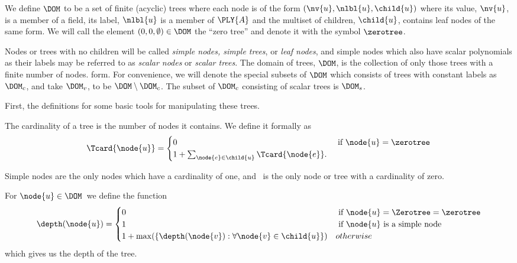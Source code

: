 \begin{definition}\label{def-of-dom}
We define $\DOM$ to be a set of finite (acyclic) trees where each node is of the form
$(\nv{u},\nlbl{u},\child{u})$
where its value, $\nv{u}$, is a member
of a field, its label, \(\nlbl{u}\) is a member of $\PLY{A}$ and
the multiset of children, $\child{u}$, contains leaf nodes of the same
form. We will call the element $(0, 0, \emptyset) \in \DOM$ the
``zero tree'' and denote it with the symbol $\zerotree$.

Nodes or trees with no children will be called \emph{simple nodes,
  simple trees}, or \emph{leaf nodes}, and simple nodes which also
have scalar polynomials as their labels may be referred to as
\emph{scalar nodes} or \emph{scalar trees}. The domain of trees,
$\DOM$, is the collection of only those trees with a finite number of
nodes.  form. For convenience, we will denote the special subsets of
$\DOM$ which consists of trees with constant labels as $\DOM_c$, and
take $\DOM_v$, to be $\DOM \setminus \DOM_c$.  The subset of $\DOM_c$
consisting of scalar trees is $\DOM_s$.
\end{definition}

First, the definitions for some basic tools for manipulating these trees.
\begin{definition}
  The cardinality of a tree is the number of nodes it contains. We define it formally as
  \begin{align*}
    \Tcard{\node{u}} = \begin{cases}
      0 & \text{ if } \node{u} = \zerotree\\
      1 + \sum_{\node{e}\in\child{u}} \Tcard{\node{e}}.
    \end{cases}
  \end{align*}

  Simple nodes are the only nodes which have a cardinality of one, and \tzerotree\ is the only node or tree with a
  cardinality of zero.
\end{definition}

\begin{definition}
  For $\node{u} \in \DOM$\ we define the function
  \begin{align*}
    \depth(\node{u}) = \begin{cases}
      0 & \text{ if } \node{u} = \Zerotree = \zerotree \\
      1 & \text{ if } \node{u} \text{ is a simple node} \\
      1 + \max(\lbrace\depth(\node{v}):\forall \node{v} \in \child{u}\rbrace) & otherwise
    \end{cases}
  \end{align*}
  which gives us the depth of the tree.
\end{definition}

